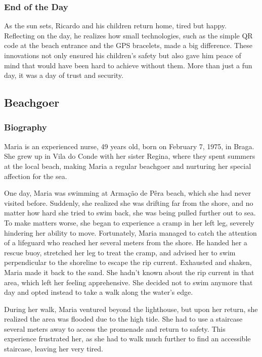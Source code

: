 \subsubsection{\textbf{End of the Day}}
As the sun sets, Ricardo and his children return home, tired but happy. Reflecting on the day, he realizes how small technologies, such as the simple QR code at the beach entrance and the GPS bracelets, made a big difference. These innovations not only ensured his children’s safety but also gave him peace of mind that would have been hard to achieve without them. More than just a fun day, it was a day of trust and security.

\subsection{Beachgoer}
\subsubsection{ \textbf{Biography}}
Maria is an experienced nurse, 49 years old, born on February 7, 1975, in Braga. She grew up in Vila do Conde with her sister Regina, where they spent summers at the local beach, making Maria a regular beachgoer and nurturing her special affection for the sea.

One day, Maria was swimming at Armação de Pêra beach, which she had never visited before. Suddenly, she realized she was drifting far from the shore, and no matter how hard she tried to swim back, she was being pulled further out to sea. To make matters worse, she began to experience a cramp in her left leg, severely hindering her ability to move. Fortunately, Maria managed to catch the attention of a lifeguard who reached her several meters from the shore. He handed her a rescue buoy, stretched her leg to treat the cramp, and advised her to swim perpendicular to the shoreline to escape the rip current. Exhausted and shaken, Maria made it back to the sand. She hadn’t known about the rip current in that area, which left her feeling apprehensive. She decided not to swim anymore that day and opted instead to take a walk along the water’s edge.

During her walk, Maria ventured beyond the lighthouse, but upon her return, she realized the area was flooded due to the high tide. She had to use a staircase several meters away to access the promenade and return to safety. This experience frustrated her, as she had to walk much further to find an accessible staircase, leaving her very tired.

